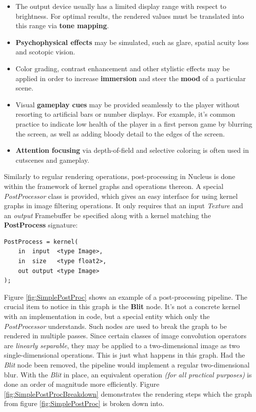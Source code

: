 \begin{itemize}
\item The output device usually has a limited display range with respect to brightness. For optimal results, the rendered values must be translated into this range via \textbf{tone mapping}.
\item \textbf{Psychophysical effects} may be simulated, such as glare, spatial acuity loss and scotopic vision.
\item Color grading, contrast enhancement and other stylistic effects may be applied in order to increase \textbf{immersion} and steer the \textbf{mood} of a particular scene.
\item Visual \textbf{gameplay cues} may be provided seamlessly to the player without resorting to artificial bars or number displays. For example, it's common practice to indicate low health of the player in a first person game by blurring the screen, as well as adding bloody detail to the edges of the screen.
\item \textbf{Attention focusing} via depth-of-field and selective coloring is often used in cutscenes and gameplay.
\end{itemize}

Similarly to regular rendering operations, post-processing in Nucleus is done within the framework of kernel graphs and operations thereon. A special \emph{PostProcessor} class is provided, which gives an easy interface for using kernel graphs in image filtering operations. It only requires that an input \emph{Texture} and an \emph{output} Framebuffer be specified along with a kernel matching the \textbf{PostProcess} signature:

\begin{lstlisting}[frame=single]
PostProcess = kernel(
    in  input  <type Image>,
    in  size   <type float2>,
    out output <type Image>
);
\end{lstlisting}

Figure \ref{fig:SimplePostProc} shows an example of a post-processing pipeline. The crucial item to notice in this graph is the \textbf{Blit} node. It's not a concrete kernel with an implementation in code, but a special entity which only the \emph{PostProcessor} understands. Such nodes are used to break the graph to be rendered in multiple passes. Since certain classes of image convolution operators are \emph{linearly separable}, they may be applied to a two-dimensional image as two single-dimensional operations. This is just what happens in this graph. Had the \emph{Blit} node been removed, the pipeline would implement a regular two-dimensional blur. With the \emph{Blit} in place, an equivalent operation \emph{(for all practical purposes)} is done an order of magnitude more efficiently. Figure \ref{fig:SimplePostProcBreakdown} demonstrates the rendering steps which the graph from figure \ref{fig:SimplePostProc} is broken down into.

